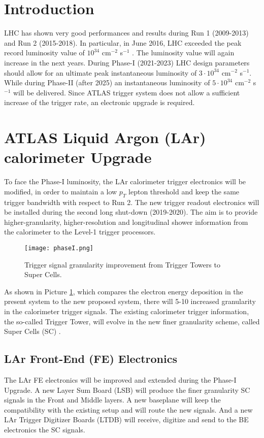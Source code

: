 \documentclass{llncs}
\begin{document}
\section{Introduction}
LHC has shown very good performances and results during Run 1 (2009-2013) and Run 2 (2015-2018). In particular, in June 2016, LHC exceeded the peak record luminosity value of $10^{34}$ cm$^{-2}$ s$^{-1}$ \cite{Pralavorio:2203203}. The luminosity value will again increase in the next years. During Phase-I (2021-2023) LHC design parameters should allow for an ultimate peak instantaneous luminosity of $3 \cdot 10^{34}$ cm$^{-2}$ s$^{-1}$. While during Phase-II (after 2025) an instantaneous luminosity of $5 \cdot 10^{34}$ cm$^{-2}$ s$^{-1}$ will be delivered. Since ATLAS trigger system does not allow a sufficient increase of the trigger rate, an electronic upgrade is required.

\section{ATLAS Liquid Argon (LAr) calorimeter Upgrade}
To face the Phase-I luminosity, the LAr calorimeter trigger electronics will be modified, in order to maintain a low $p_{T}$ lepton threshold and keep the same trigger bandwidth with respect to Run 2. The new trigger readout electronics will be installed during the second long shut-down (2019-2020). The aim is to provide higher-granularity, higher-resolution and longitudinal shower information from the calorimeter to the Level-1 trigger processors.
\begin{figure}[h]
	\centering	
	\texttt{[image: phaseI.png]}
	\caption{Trigger signal granularity improvement from Trigger Towers to Super Cells.}
	\label{fig:PhaseI}
\end{figure}
As shown in Picture \ref{fig:PhaseI}, which compares the electron energy deposition in the present system to the new proposed system, there will 5-10 increased granularity in the calorimeter trigger signals.
The existing calorimeter trigger information, the so-called Trigger Tower, will evolve in the new finer granularity scheme, called Super Cells (SC) \cite{Aleksa:1602230}.

\subsection{LAr Front-End (FE) Electronics}
The LAr FE electronics will be improved and extended during the Phase-I Upgrade. A new Layer Sum Board (LSB) will produce the finer granularity SC signals in the Front and Middle layers. A new baseplane will keep the compatibility with the existing setup and will route the new signals. And a new LAr Trigger Digitizer Boards (LTDB) will receive, digitize and send to the BE electronics the SC signals.
\end{document}
